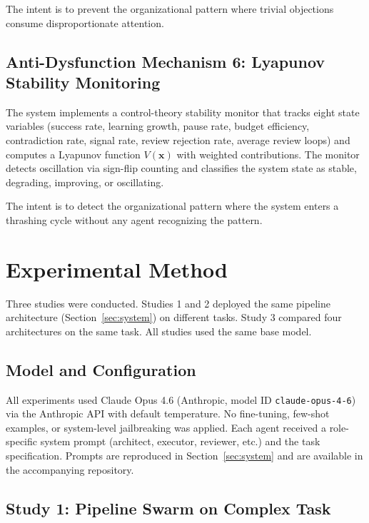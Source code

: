 \documentclass[11pt,a4paper]{article}
\begin{document}
The intent is to prevent the organizational pattern where trivial objections consume disproportionate attention.

\subsection{Anti-Dysfunction Mechanism 6: Lyapunov Stability Monitoring}

The system implements a control-theory stability monitor that tracks eight state variables (success rate, learning growth, pause rate, budget efficiency, contradiction rate, signal rate, review rejection rate, average review loops) and computes a Lyapunov function $V(\mathbf{x})$ with weighted contributions. The monitor detects oscillation via sign-flip counting and classifies the system state as stable, degrading, improving, or oscillating.

The intent is to detect the organizational pattern where the system enters a thrashing cycle without any agent recognizing the pattern.


\section{Experimental Method}
\label{sec:method}

Three studies were conducted. Studies 1 and 2 deployed the same pipeline architecture (Section~\ref{sec:system}) on different tasks. Study 3 compared four architectures on the same task. All studies used the same base model.

\subsection{Model and Configuration}

All experiments used Claude Opus 4.6 (Anthropic, model ID \texttt{claude-opus-4-6}) via the Anthropic API with default temperature. No fine-tuning, few-shot examples, or system-level jailbreaking was applied. Each agent received a role-specific system prompt (architect, executor, reviewer, etc.) and the task specification. Prompts are reproduced in Section~\ref{sec:system} and are available in the accompanying repository.

\subsection{Study 1: Pipeline Swarm on Complex Task}
\end{document}
